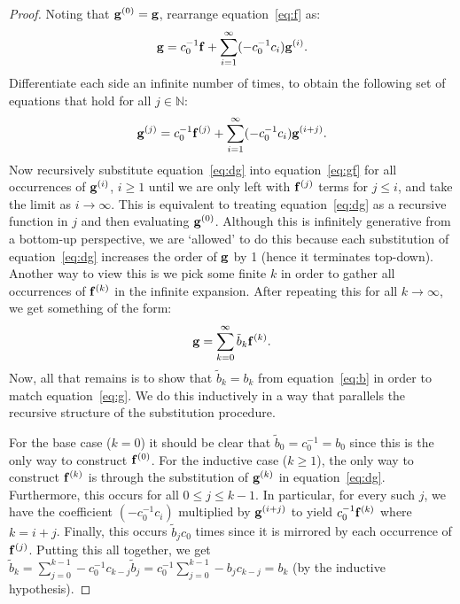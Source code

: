 \begin{proof}
Noting that $\mathbf{g}^{(0)} = \mathbf{g}$, rearrange equation~\ref{eq:f} as:
\begin{equation} \label{eq:gf}
\mathbf{g} = c_0^{-1} \mathbf{f} + \sum_{i=1}^\infty (-c_0^{-1} c_i) \mathbf{g}^{(i)} \text{.}
\end{equation}
Differentiate each side an infinite number of times, to obtain the following set of equations that hold for all $j \in \mathbb{N}$:
\begin{equation} \label{eq:dg}
\mathbf{g}^{(j)} = c_0^{-1} \mathbf{f}^{(j)} + \sum_{i=1}^\infty (-c_0^{-1} c_i) \mathbf{g}^{(i+j)} \text{.}
\end{equation}
Now recursively substitute equation~\ref{eq:dg} into equation~\ref{eq:gf} for all occurrences of $\mathbf{g}^{(i)}$, $i \ge 1$ until we are only left with $\mathbf{f}^{(j)}$ terms for $j \le i$, and take the limit as $i \rightarrow \infty$. This is equivalent to treating equation~\ref{eq:dg} as a recursive function in $j$ and then evaluating $\mathbf{g}^{(0)}$.
Although this is infinitely generative from a bottom-up perspective, we are `allowed' to do this because each substitution of equation~\ref{eq:dg} increases the order of $\mathbf{g}$ by 1 (hence it terminates top-down). Another way to view this is we pick some finite $k$ in order to gather all occurrences of $\mathbf{f}^{(k)}$ in the infinite expansion. After repeating this for all $k \rightarrow \infty$, we get something of the form:
\begin{equation*}
\mathbf{g} = \sum_{k=0}^\infty \tilde{b}_k \mathbf{f}^{(k)} \text{.}
\end{equation*}
Now, all that remains is to show that $\tilde{b}_k = b_k$ from equation~\ref{eq:b} in order to match equation~\ref{eq:g}. We do this inductively in a way that parallels the recursive structure of the substitution procedure.

For the base case ($k = 0$) it should be clear that $\tilde{b}_0 = c_0^{-1} = b_0$ since this is the only way to construct $\mathbf{f}^{(0)}$.
For the inductive case ($k \ge 1$), the only way to construct $\mathbf{f}^{(k)}$ is through the substitution of $\mathbf{g}^{(k)}$ in equation~\ref{eq:dg}.
Furthermore, this occurs for all $0 \le j \le k - 1$. In particular, for every such $j$, we have the coefficient $(-c_0^{-1} c_{i})$ multiplied by $\mathbf{g}^{(i + j)}$ to yield $c_0^{-1} \mathbf{f}^{(k)}$ where $k = i + j$.
Finally, this occurs $\tilde{b}_{j} c_0$ times since it is mirrored by each occurrence of $\mathbf{f}^{(j)}$.
Putting this all together, we get $\tilde{b}_k = \sum_{j=0}^{k-1} -c_0^{-1} c_{k - j} \tilde{b}_j = c_0^{-1} \sum_{j=0}^{k-1} - b_j c_{k - j} = b_k$ (by the inductive hypothesis).
\end{proof}

